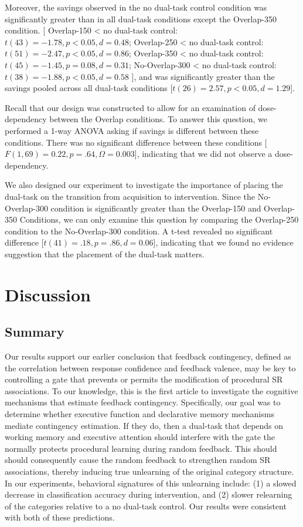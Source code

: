 \documentclass[apacite,draftfirst,jou]{apa6}
\begin{document}
Moreover, the savings observed in the no dual-task control condition was
significantly greater than in all dual-task conditions except the Overlap-350
condition.
[
Overlap-150 < no dual-task control: $t(43) = -1.78, p < 0.05, d = 0.48$;
Overlap-250 < no dual-task control: $t(51) = -2.47, p < 0.05, d = 0.86$;
Overlap-350 < no dual-task control: $t(45) = -1.45, p = 0.08, d = 0.31$;
No-Overlap-300 < no dual-task control: $t(38) = -1.88, p < 0.05, d = 0.58$
], and was significantly greater than the savings pooled across all dual-task
conditions [$t(26) = 2.57, p < 0.05, d = 1.29$].

Recall that our design was constructed to allow for an examination of
dose-dependency between the Overlap conditions. To answer this question, we
performed a 1-way ANOVA asking if savings is different between these conditions.
There was no significant difference between these conditions [$F(1,69) = 0.22, p
= .64, \Omega = 0.003$], indicating that we did not observe a dose-dependency.

We also designed our experiment to investigate the importance of placing the
dual-task on the transition from acquisition to intervention. Since the
No-Overlap-300 condition is significantly greater than the Overlap-150 and
Overlap-350 Conditions, we can only examine this question by comparing the
Overlap-250 condition to the No-Overlap-300 condition. A t-test revealed no
significant difference [$t(41) = .18, p = .86, d = 0.06$], indicating that we
found no evidence suggestion that the placement of the dual-task matters.

\section*{Discussion}
\subsection*{Summary}
Our results support our earlier conclusion \cite{crossley_erasing_2013} that
feedback contingency, defined as the correlation between response confidence and
feedback valence, may be key to controlling a gate that prevents or permits the
modification of procedural SR associations. To our knowledge, this is the first
article to investigate the cognitive mechanisms that estimate feedback
contingency. Specifically, our goal was to determine whether executive function
and declarative memory mechanisms mediate contingency estimation. If they do,
then a dual-task that depends on working memory and executive attention should
interfere with the gate the normally protects procedural learning during random
feedback. This should should consequently cause the random feedback to
strengthen random SR associations, thereby inducing true unlearning of the
original category structure. In our experiments, behavioral signatures of this
unlearning include: (1) a slowed decrease in classification accuracy during
intervention, and (2) slower relearning of the categories relative to a no
dual-task control. Our results were consistent with both of these predictions.
\end{document}
